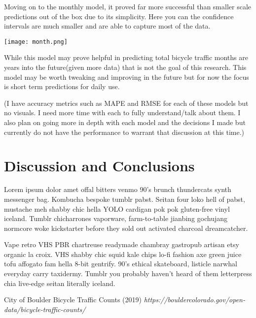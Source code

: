 \documentclass[twoside]{article}
\begin{document}
\begin{multicols}{2}
Moving on to the monthly model, it proved far more successful than smaller scale predictions out of the box due to its simplicity. Here you can the confidence intervals are much smaller and are able to capture most of the data.  

\texttt{[image: month.png]}

While this model may prove helpful in predicting total bicycle traffic months are years into the future(given more data) that is not the goal of this research. This model may be worth tweaking and improving in the future but for now the focus is short term predictions for daily use.  

(I have accuracy metrics such as MAPE and RMSE for each of these models but no visuals. I need more time with each to fully understand/talk about them. I also plan on going more in depth with each model and the decisions I made but currently do not have the performance to warrant that discussion at this time.)

\section{Discussion and Conclusions}

Lorem ipsum dolor amet offal bitters venmo 90's brunch thundercats synth messenger bag. Kombucha bespoke tumblr pabst. Seitan four loko hell of pabst, mustache meh shabby chic hella YOLO cardigan pok pok gluten-free vinyl iceland. Tumblr chicharrones vaporware, farm-to-table jianbing gochujang normcore woke kickstarter before they sold out activated charcoal dreamcatcher.

Vape retro VHS PBR chartreuse readymade chambray gastropub artisan etsy organic la croix. VHS shabby chic squid kale chips lo-fi fashion axe green juice tofu affogato fam hella 8-bit gentrify. 90's ethical skateboard, listicle narwhal everyday carry taxidermy. Tumblr you probably haven't heard of them letterpress chia live-edge seitan literally iceland.


\begin{thebibliography}{99} %

City of Boulder Bicycle Traffic Counts (2019) {\em https://bouldercolorado.gov/open-data/bicycle-traffic-counts/}


\end{thebibliography}
\end{multicols}
\end{document}
